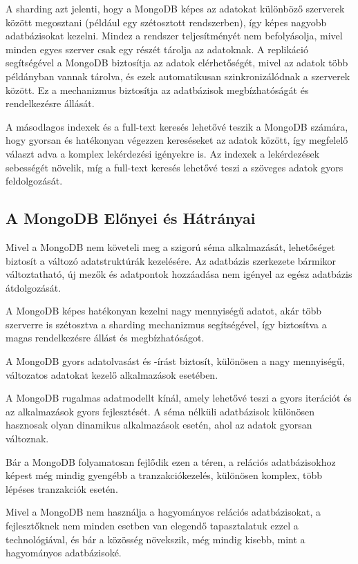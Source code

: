 \documentclass[
]{thesis-ekf}
\theoremstyle{definition}
\theoremstyle{remark}
\begin{document}
A sharding azt jelenti, hogy a MongoDB képes az adatokat különböző szerverek között megosztani (például egy szétosztott rendszerben), így képes nagyobb adatbázisokat kezelni. Mindez a rendszer teljesítményét nem befolyásolja, mivel minden egyes szerver csak egy részét tárolja az adatoknak. A replikáció segítségével a MongoDB biztosítja az adatok elérhetőségét, mivel az adatok több példányban vannak tárolva, és ezek automatikusan szinkronizálódnak a szerverek között. Ez a mechanizmus biztosítja az adatbázisok megbízhatóságát és rendelkezésre állását.

A másodlagos indexek és a full-text keresés lehetővé teszik a MongoDB számára, hogy gyorsan és hatékonyan végezzen kereséseket az adatok között, így megfelelő választ adva a komplex lekérdezési igényekre is. Az indexek a lekérdezések sebességét növelik, míg a full-text keresés lehetővé teszi a szöveges adatok gyors feldolgozását.

\subsection{A MongoDB Előnyei és Hátrányai}

Mivel a MongoDB nem követeli meg a szigorú séma alkalmazását, lehetőséget biztosít a változó adatstruktúrák kezelésére. Az adatbázis szerkezete bármikor változtatható, új mezők és adatpontok hozzáadása nem igényel az egész adatbázis átdolgozását.

A MongoDB képes hatékonyan kezelni nagy mennyiségű adatot, akár több szerverre is szétosztva a sharding mechanizmus segítségével, így biztosítva a magas rendelkezésre állást és megbízhatóságot.

A MongoDB gyors adatolvasást és -írást biztosít, különösen a nagy mennyiségű, változatos adatokat kezelő alkalmazások esetében.

A MongoDB rugalmas adatmodellt kínál, amely lehetővé teszi a gyors iterációt és az alkalmazások gyors fejlesztését. A séma nélküli adatbázisok különösen hasznosak olyan dinamikus alkalmazások esetén, ahol az adatok gyorsan változnak.

Bár a MongoDB folyamatosan fejlődik ezen a téren, a relációs adatbázisokhoz képest még mindig gyengébb a tranzakciókezelés, különösen komplex, több lépéses tranzakciók esetén.

Mivel a MongoDB nem használja a hagyományos relációs adatbázisokat, a fejlesztőknek nem minden esetben van elegendő tapasztalatuk ezzel a technológiával, és bár a közösség növekszik, még mindig kisebb, mint a hagyományos adatbázisoké.
\end{document}
